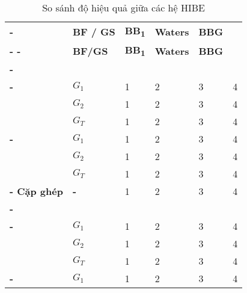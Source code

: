 \begin{longtabu}{| >{\bfseries\centering}p{2cm} | >{\bfseries\centering}p{0.5cm} | X[c] X[c] X[c] X[c] |}
	\caption{So sánh độ hiệu quả giữa các hệ HIBE} \\
	\tabucline[4pt]-
	 &
	\bfseries BF / GS \newline &
	\bfseries BB\textsubscript{1} &
	\bfseries Waters &
	\bfseries BBG \\
	\tabucline[2pt]-
	\endfirsthead
	\tabucline[4pt]-
	 &
	\bfseries BF/GS \newline &
	\bfseries BB\textsubscript{1} &
	\bfseries Waters &
	\bfseries BBG \\
	\tabucline[2pt]-
	\endhead
	 \\
	\tabucline[1pt]-
	 \newline & $G_1$ & 1 & 2 & 3 & 4 \\
	& $G_2$ \newline & 1 & 2 & 3 & 4 \\
	& $G_T$ \newline & 1 & 2 & 3 & 4 \\
	\tabucline[1pt]-
	 \newline & $G_1$ & 1 & 2 & 3 & 4 \\
	& $G_2$ \newline & 1 & 2 & 3 & 4 \\
	& $G_T$ \newline & 1 & 2 & 3 & 4 \\
	\tabucline[1pt]-
	Cặp ghép \newline & - & 1 & 2 & 3 & 4 \\
	\tabucline[2pt]-
	 \\
	\tabucline[1pt]-
	 \newline & $G_1$ & 1 & 2 & 3 & 4 \\
	& $G_2$ \newline & 1 & 2 & 3 & 4 \\
	& $G_T$ \newline & 1 & 2 & 3 & 4 \\
	\tabucline[1pt]-
	 \newline & $G_1$ & 1 & 2 & 3 & 4 \\

\end{longtabu}
